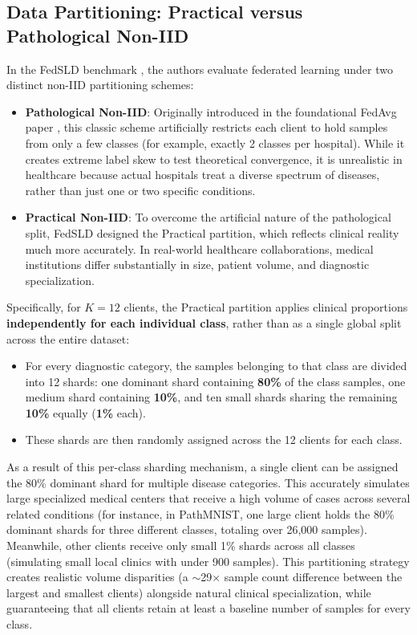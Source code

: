 \subsection{Data Partitioning: Practical versus Pathological Non-IID}
In the FedSLD benchmark \cite{luo2022fedsld}, the authors evaluate federated learning under two distinct non-IID partitioning schemes:
\begin{itemize}
    \item \textbf{Pathological Non-IID}: Originally introduced in the foundational FedAvg paper \cite{mcmahan2017communication}, this classic scheme artificially restricts each client to hold samples from only a few classes (for example, exactly 2 classes per hospital). While it creates extreme label skew to test theoretical convergence, it is unrealistic in healthcare because actual hospitals treat a diverse spectrum of diseases, rather than just one or two specific conditions.
    \item \textbf{Practical Non-IID}: To overcome the artificial nature of the pathological split, FedSLD \cite{luo2022fedsld} designed the Practical partition, which reflects clinical reality much more accurately. In real-world healthcare collaborations, medical institutions differ substantially in size, patient volume, and diagnostic specialization.
\end{itemize}

Specifically, for $K = 12$ clients, the Practical partition applies clinical proportions \textbf{independently for each individual class}, rather than as a single global split across the entire dataset:
\begin{itemize}
    \item For every diagnostic category, the samples belonging to that class are divided into 12 shards: one dominant shard containing \textbf{80\%} of the class samples, one medium shard containing \textbf{10\%}, and ten small shards sharing the remaining \textbf{10\%} equally (\textbf{1\%} each).
    \item These shards are then randomly assigned across the 12 clients for each class.
\end{itemize}

As a result of this per-class sharding mechanism, a single client can be assigned the 80\% dominant shard for multiple disease categories. This accurately simulates large specialized medical centers that receive a high volume of cases across several related conditions (for instance, in PathMNIST, one large client holds the 80\% dominant shards for three different classes, totaling over 26,000 samples). Meanwhile, other clients receive only small 1\% shards across all classes (simulating small local clinics with under 900 samples). This partitioning strategy creates realistic volume disparities (a $\sim$29$\times$ sample count difference between the largest and smallest clients) alongside natural clinical specialization, while guaranteeing that all clients retain at least a baseline number of samples for every class.


